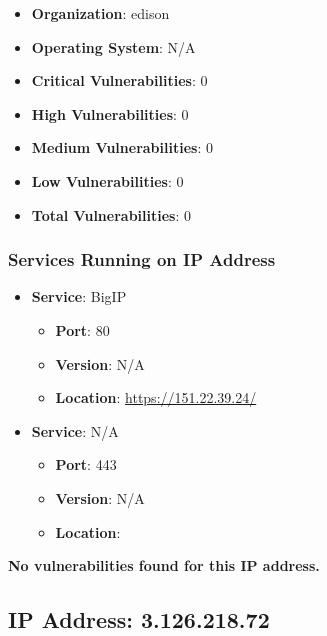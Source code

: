 \documentclass{article}
\begin{document}
\begin{itemize}
    \item \textbf{Organization}: edison
    \item \textbf{Operating System}:  N/A 
    \item \textbf{Critical Vulnerabilities}: 0
    \item \textbf{High Vulnerabilities}: 0
    \item \textbf{Medium Vulnerabilities}: 0
    \item \textbf{Low Vulnerabilities}: 0
    \item \textbf{Total Vulnerabilities}: 0
\end{itemize}

\subsubsection*{Services Running on IP Address}

\begin{itemize}
    
        \item \textbf{Service}: BigIP
        \begin{itemize}
            \item \textbf{Port}: 80
            \item \textbf{Version}:  N/A 
            \item \textbf{Location}: \href{ https://151.22.39.24/ }{ https://151.22.39.24/ }
        \end{itemize}
    
        \item \textbf{Service}: N/A
        \begin{itemize}
            \item \textbf{Port}: 443
            \item \textbf{Version}:  N/A 
            \item \textbf{Location}: \href{  }{  }
        \end{itemize}
    
\end{itemize}


\textbf{No vulnerabilities found for this IP address.}




\clearpage



\subsection{IP Address: 3.126.218.72}
\end{document}
